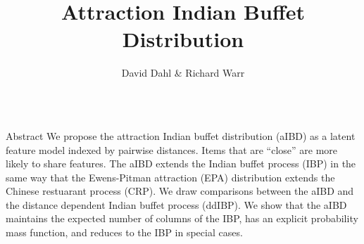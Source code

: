 \documentclass[serif,mathserif,final]{beamer}
\title{Attraction Indian Buffet Distribution}
\author{David Dahl \& Richard Warr}
\institute{Brigham Young University}
\begin{document}
\begin{frame}{}
  \vskip-1cm



  \begin{columns}[t]




    \begin{column}{0.4\linewidth}

      
\begin{block}{Abstract}
        We propose the attraction Indian buffet distribution (aIBD) as 
        a latent feature model indexed by pairwise distances.
        Items that are ``close'' are more likely to share features.
        The aIBD extends the Indian buffet process (IBP) in the same way
        that the Ewens-Pitman attraction (EPA) distribution extends the
        Chinese restuarant process (CRP).
        We draw comparisons between the aIBD and the distance dependent Indian
        buffet process (ddIBP). We show that the aIBD maintains the expected
        number of columns of the IBP, has an explicit probability mass
        function, and reduces to the IBP in special cases.

      \end{block}

\vspace{1em}


\end{column}
\end{columns}
\end{frame}
\end{document}
